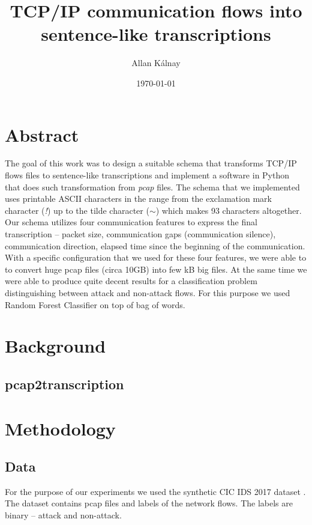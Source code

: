 \documentclass{article}
\title{TCP/IP communication flows into sentence-like transcriptions}
\author{Allan Kálnay}
\date{\today}
\begin{document}
\sloppy

\maketitle

\section*{Abstract}
The goal of this work was to design a suitable schema that transforms TCP/IP flows files to sentence-like transcriptions and implement a software in Python that does such transformation from \textit{pcap} files. The schema that we implemented uses printable ASCII characters in the range from the exclamation mark character (\textit{!}) up to the tilde character (\textit{$\sim$}) which makes 93 characters altogether. Our schema utilizes four communication features to express the final transcription -- packet size, communication gaps (communication silence), communication direction, elapsed time since the beginning of the communication. With a specific configuration that we used for these four features, we were able to to convert huge pcap files (circa 10GB) into few kB big files. At the same time we were able to produce quite decent results for a classification problem distinguishing between attack and non-attack flows. For this purpose we used Random Forest Classifier on top of bag of words.

\newpage
\tableofcontents
\newpage

\section{Background}
\subsection{pcap2transcription}

\section{Methodology}
\subsection{Data}
For the purpose of our experiments we used the synthetic CIC IDS 2017 dataset \cite{sharafaldin2018toward}. The dataset contains pcap files and labels of the network flows. The labels are binary -- attack and non-attack.
\end{document}
